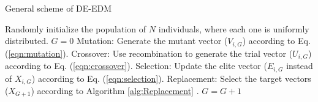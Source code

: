 \begin{algorithm}[t]
  \scriptsize
	\caption{General scheme of DE-EDM} 
	\begin{algorithmic}[1]
	\STATE Randomly initialize the population of $N$ individuals, where each one is uniformly distributed.
	\STATE $G=0$
		\STATE Mutation: Generate the mutant vector ($V_{i,G}$) according to Eq. (\ref{eqn:mutation}).
		\STATE Crossover: Use recombination to generate the trial vector ($U_{i,G}$) according to Eq. (\ref{eqn:crossover}).
		\STATE Selection: Update the elite vector ($E_{i,G}$ instead of $X_{i,G}$) according to Eq. (\ref{eqn:selection}).
	   \ENDFOR
		\STATE Replacement: Select the target vectors ($X_{G+1}$) according to Algorithm \ref{alg:Replacement} .
	   \STATE $G=G+1$
	\ENDWHILE
\end{algorithmic}
    \label{alg:DEEDM}
\end{algorithm}

%
%
%
%
%
%
%
%
%

